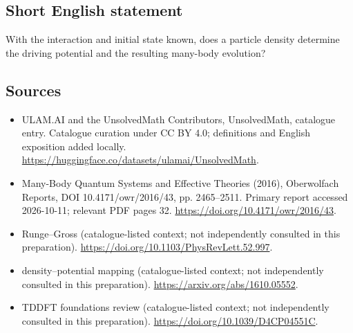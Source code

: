 \documentclass[11pt]{article}
\begin{document}
\subsection{Short English statement}
With the interaction and initial state known, does a particle density determine the driving potential and the resulting many-body evolution?
\subsection{Sources}
\begin{itemize}
\item[\hypertarget{source:statement:1}{S1}] ULAM.AI and the UnsolvedMath Contributors, UnsolvedMath, catalogue entry. Catalogue curation under CC BY 4.0; definitions and English exposition added locally.
\url{https://huggingface.co/datasets/ulamai/UnsolvedMath}.
\item[\hypertarget{source:statement:2}{S2}] Many-Body Quantum Systems and Effective Theories (2016), Oberwolfach Reports, DOI 10.4171/owr/2016/43, pp. 2465--2511. Primary report accessed 2026-10-11; relevant PDF pages 32.
\url{https://doi.org/10.4171/owr/2016/43}.
\item[\hypertarget{source:statement:3}{S3}] Runge--Gross (catalogue-listed context; not independently consulted in this preparation).
\url{https://doi.org/10.1103/PhysRevLett.52.997}.
\item[\hypertarget{source:statement:4}{S4}] density--potential mapping (catalogue-listed context; not independently consulted in this preparation).
\url{https://arxiv.org/abs/1610.05552}.
\item[\hypertarget{source:statement:5}{S5}] TDDFT foundations review (catalogue-listed context; not independently consulted in this preparation).
\url{https://doi.org/10.1039/D4CP04551C}.
\end{itemize}
\label{end:statement}
\end{document}
